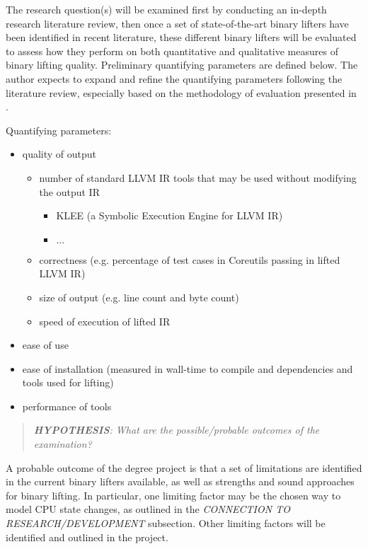 \documentclass[12pt, a4paper]{article}
\begin{document}
The research question(s) will be examined first by conducting an in-depth research literature review, then once a set of state-of-the-art binary lifters have been identified in recent literature, these different binary lifters will be evaluated to assess how they perform on both quantitative and qualitative measures of binary lifting quality. Preliminary quantifying parameters are defined below. The author expects to expand and refine the quantifying parameters following the literature review, especially based on the methodology of evaluation presented in \cite{evaluation_of_irs}.

Quantifying parameters:
\begin{itemize}
	\item quality of output
	\begin{itemize}
		\item number of standard LLVM IR tools that may be used without modifying the output IR
		\begin{itemize}
			\item KLEE (a Symbolic Execution Engine for LLVM IR)
			\item $\dots$
		\end{itemize}
		\item correctness (e.g. percentage of test cases in Coreutils passing in lifted LLVM IR)
		\item size of output (e.g. line count and byte count)
		\item speed of execution of lifted IR
	\end{itemize}
	\item ease of use
	\item ease of installation (measured in wall-time to compile and dependencies and tools used for lifting)
	\item performance of tools
\end{itemize}

\begin{quote}
	\textit{\textbf{HYPOTHESIS}: What are the possible/probable outcomes of the examination?}
\end{quote}

A probable outcome of the degree project is that a set of limitations are identified in the current binary lifters available, as well as strengths and sound approaches for binary lifting. In particular, one limiting factor may be the chosen way to model CPU state changes, as outlined in the \textit{CONNECTION TO RESEARCH/DEVELOPMENT} subsection. Other limiting factors will be identified and outlined in the project.
\end{document}
